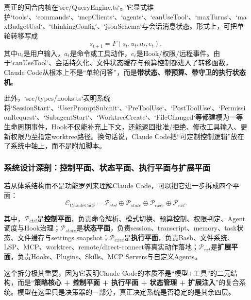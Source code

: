 \documentclass[12pt,a4paper]{article}
\begin{document}
真正的回合内核在`src/QueryEngine.ts`。它显式维护`tools`、`commands`、`mcpClients`、`agents`、`canUseTool`、`maxTurns`、`maxBudgetUsd`、`thinkingConfig`、`jsonSchema`与会话消息状态。形式上，可把单轮转移写成
\begin{equation}
s_{t+1} = F(s_t, u_t, a_t, e_t),
\end{equation}
其中$u_t$是用户输入，$a_t$是命令或工具动作，$e_t$是Hook/权限/远程事件。由于`canUseTool`、会话持久化、文件状态缓存与预算控制都进入了转移函数，Claude Code从根本上不是“单轮问答”，而是\textbf{带状态、带预算、带守卫的执行状态机}。

此外，`src/types/hooks.ts`表明系统将`SessionStart`、`UserPromptSubmit`、`PreToolUse`、`PostToolUse`、`PermissionRequest`、`SubagentStart`、`WorktreeCreate`、`FileChanged`等都建模为一等生命周期事件，Hook不仅能补充上下文，还能返回批准/拒绝、修改工具输入、更新权限乃至指定worktree路径。换句话说，Claude Code把“可定制控制逻辑”放在了系统中轴上，而不是附加脚本。

\subsubsection{系统设计深剖：控制平面、状态平面、执行平面与扩展平面}

若从体系结构而不是功能罗列来理解Claude Code，可以把它进一步拆成四个平面：
\begin{equation}
\mathcal{C}_{\text{ClaudeCode}} =
\mathcal{P}_{ctrl} \oplus \mathcal{P}_{state} \oplus \mathcal{P}_{exec} \oplus \mathcal{P}_{ext}.
\end{equation}

其中，$\mathcal{P}_{ctrl}$是\textbf{控制平面}，负责命令解析、模式切换、预算控制、权限判定、Agent调度与Hook治理；$\mathcal{P}_{state}$是\textbf{状态平面}，负责session、transcript、memory、task状态、文件缓存与settings snapshot；$\mathcal{P}_{exec}$是\textbf{执行平面}，负责Bash、文件系统、LSP、MCP、worktree、remote/direct-connect等真实动作落地；$\mathcal{P}_{ext}$是\textbf{扩展平面}，负责Hooks、Plugins、Skills、MCP Servers与自定义Agents。

这个拆分极其重要，因为它表明Claude Code的本质不是“模型+工具”的二元结构，而是“\textbf{策略核心 + 控制平面 + 执行平面 + 状态管理 + 扩展注入}”的复合系统。模型在这里只是决策器的一部分，真正决定系统是否稳定的是其余四层。
\end{document}
